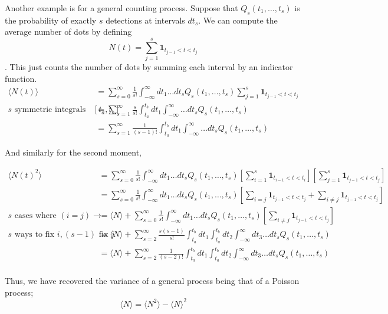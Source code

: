 Another example is for a general counting process. Suppose that $Q_s(t_1, \dots, t_s)$ is the probability of exactly $s$ detections at intervals $dt_s$. We can compute the average number of dots by defining \[N(t) = \sum_{j=1}^s\mathbf{1}_{t_{j-1} < t < t_j}\]. This just counts the number of dots by summing each interval by an indicator function. 
\begin{align*}
	\langle N(t) \rangle &= \sum_{s=0}^\infty \frac{1}{s!} \int_{-\infty}^\infty dt_1 \dots dt_s Q_s(t_1, \dots, t_s) \sum_{j=1}^s\mathbf{1}_{t_{j-1} < t < t_j} \\
	s\text{ symmetric integrals over }[t_a, t_b]&= \sum_{s=1}^\infty \frac{s}{s!} \int_{t_a}^{t_b}dt_1\int_{-\infty}^\infty \dots dt_s Q_s(t_1, \dots, t_s) \\
	&= \sum_{s=1}^\infty \frac{1}{(s-1)!} \int_{t_a}^{t_b}dt_1\int_{-\infty}^\infty \dots dt_s Q_s(t_1, \dots, t_s) 
 \end{align*}
 
 And similarly for the second moment,
 
 \begin{align*}
 	\langle N(t)^2 \rangle 
 	&= \sum_{s=0}^\infty \frac{1}{s!} \int_{-\infty}^\infty dt_1 \dots dt_s Q_s(t_1, \dots, t_s)\left[\sum_{i=1}^s\mathbf{1}_{t_{i-1} < t < t_i}\right] \left[\sum_{j=1}^s\mathbf{1}_{t_{j-1} < t < t_j}\right] \\ 
 	&= \sum_{s=0}^\infty \frac{1}{s!} \int_{-\infty}^\infty dt_1 \dots dt_s Q_s(t_1, \dots, t_s)\left[\sum_{i=j}\mathbf{1}_{t_{j-1} < t < t_j} + \sum_{i\neq j}\mathbf{1}_{t_{j-1} < t < t_j}\right] \\ 
 	s\text{ cases where } (i = j) \rightarrow &= \langle N \rangle + \sum_{s=0}^\infty \frac{1}{s!} \int_{-\infty}^\infty dt_1 \dots dt_s Q_s(t_1, \dots, t_s)\left[\sum_{i\neq j}\mathbf{1}_{t_{j-1} < t < t_j}\right] \\ 
 	s\text{ ways to fix }i, (s-1) \text{ fix }j &= \langle N \rangle + \sum_{s=2}^\infty \frac{s(s-1)}{s!} \int_{t_a}^{t_b} dt_1 \int_{t_a}^{t_b} dt_2 \int_{-\infty}^\infty dt_3 \dots dt_s Q_s(t_1, \dots, t_s) \\ 
 	&= \langle N \rangle + \sum_{s=2}^\infty \frac{1}{(s-2)!} \int_{t_a}^{t_b} dt_1 \int_{t_a}^{t_b} dt_2 \int_{-\infty}^\infty dt_3 \dots dt_s Q_s(t_1, \dots, t_s) \\ 
 \end{align*}
 
 Thus, we have recovered the variance of a general process being that of a Poisson process;
 \[\langle N \rangle = \langle N^2 \rangle - \langle N \rangle^2\]
 
